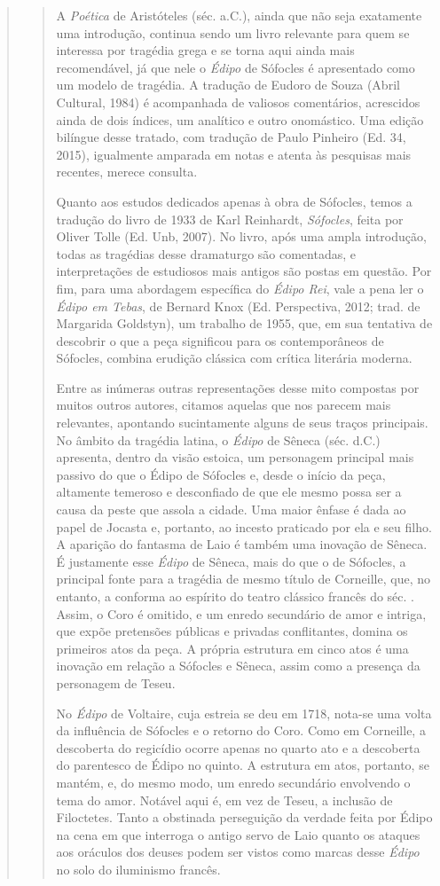 \begin{verse}
\begin{verse}
A \emph{Poética} de Aristóteles (séc.  a.C.), ainda que não
seja exatamente uma introdução, continua sendo um livro relevante para
quem se interessa por tragédia grega e se torna aqui ainda mais
recomendável, já que nele o \emph{Édipo} de Sófocles é apresentado como
um modelo de tragédia. A tradução de Eudoro de Souza (Abril Cultural,
1984) é acompanhada de valiosos comentários, acrescidos ainda de dois
índices, um analítico e outro onomástico. Uma edição bilíngue desse
tratado, com tradução
de Paulo Pinheiro (Ed. 34, 2015), igualmente amparada em notas e atenta às
pesquisas mais recentes, merece consulta.

Quanto aos estudos dedicados apenas à obra de Sófocles, temos a tradução
do livro de 1933 de Karl Reinhardt, \emph{Sófocles}, feita por
Oliver Tolle (Ed. Unb, 2007). No livro, após uma ampla introdução, todas
as tragédias desse dramaturgo são comentadas, e interpretações de
estudiosos mais antigos são postas em questão. Por fim, para uma
abordagem específica do \emph{Édipo Rei}, vale a pena ler o
\emph{Édipo em Tebas}, de Bernard Knox (Ed. Perspectiva, 2012;
trad. de Margarida Goldstyn), um trabalho de 1955, que, em sua tentativa
de descobrir o que a peça significou para os contemporâneos de Sófocles,
combina erudição clássica com crítica literária moderna.

Entre as inúmeras outras representações desse mito compostas por muitos
outros autores, citamos aquelas que nos parecem mais relevantes,
apontando sucintamente alguns de seus traços principais. No âmbito da
tragédia latina, o \emph{Édipo} de Sêneca (séc.  d.C.)
apresenta, dentro da visão estoica, um personagem principal mais passivo
do que o Édipo de Sófocles e, desde o início da peça, altamente temeroso
e desconfiado de que ele mesmo possa ser a causa da peste que assola a
cidade. Uma maior ênfase é dada ao papel de Jocasta e, portanto, ao
incesto praticado por ela e seu filho. A aparição do fantasma de Laio é
também uma inovação de Sêneca. É justamente esse \emph{Édipo} de Sêneca,
mais do que o de Sófocles, a principal fonte para a tragédia de mesmo
título de Corneille, que, no entanto, a conforma ao espírito do
teatro clássico francês do séc. . Assim, o Coro é omitido, e um
enredo secundário de amor e intriga, que expõe pretensões públicas e
privadas conflitantes, domina os primeiros atos da peça. A própria
estrutura em cinco atos é uma inovação em relação a Sófocles e Sêneca,
assim como a presença da personagem de Teseu.

No \emph{Édipo} de Voltaire, cuja estreia se deu em 1718,
nota-se uma volta da influência de Sófocles e o retorno do Coro. Como em
Corneille, a descoberta do regicídio ocorre apenas no quarto ato e a
descoberta do parentesco de Édipo no quinto. A estrutura em atos,
portanto, se mantém, e, do mesmo modo, um enredo secundário envolvendo o
tema do amor. Notável aqui é, em vez de Teseu, a inclusão de Filoctetes.
Tanto a obstinada perseguição da verdade feita por Édipo na cena em que
interroga o antigo servo de Laio quanto os ataques aos oráculos dos
deuses podem ser vistos como marcas desse \emph{Édipo} no solo do
iluminismo francês.


\end{verse}
\end{verse}
